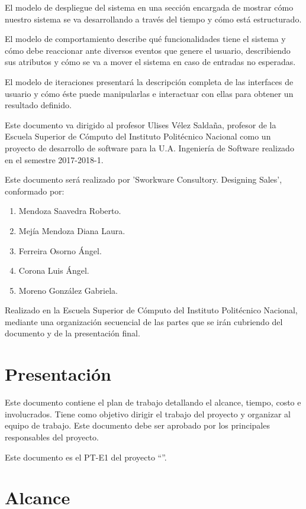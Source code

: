 El modelo de despliegue del sistema en una sección encargada de mostrar cómo nuestro sistema se va desarrollando a través del tiempo y cómo está estructurado.
	
El modelo de comportamiento describe qué funcionalidades tiene el sistema y cómo debe reaccionar ante diversos eventos que genere el usuario, describiendo sus atributos y cómo se va a mover el sistema en caso de entradas no esperadas.
	
El modelo de iteraciones presentará la descripción completa de las interfaces de usuario y cómo éste puede manipularlas e interactuar con ellas para obtener un resultado definido.
	
Este documento va dirigido al profesor Ulises Vélez Saldaña, profesor de la Escuela Superior de Cómputo del Instituto Politécnico Nacional como un proyecto de desarrollo de software para la U.A. Ingeniería de Software realizado en el semestre 2017-2018-1.
	
Este documento será realizado por ’Sworkware Consultory. Designing Sales’, conformado por: 
\begin{enumerate}
	\item Mendoza Saavedra Roberto.
	\item Mejía Mendoza Diana Laura.
	\item Ferreira Osorno Ángel.
	\item Corona Luis Ángel.
	\item Moreno González Gabriela.
\end{enumerate}

Realizado en la Escuela Superior de Cómputo del Instituto Politécnico Nacional, mediante una organización secuencial de las partes que se irán cubriendo del documento y de la presentación final.

\section{Presentación}

	Este documento contiene el plan de trabajo detallando el alcance, tiempo, costo e involucrados. Tiene como objetivo dirigir el trabajo del proyecto y organizar al equipo de trabajo. Este documento debe ser aprobado por los principales responsables del proyecto.
	
	Este documento es el PT-E1 del proyecto ``{\em\varProyecto}''.

\section{Alcance}	

